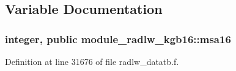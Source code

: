 \subsection{Variable Documentation}
\subsubsection[{\texorpdfstring{msa16}{msa16}}]{\setlength{\rightskip}{0pt plus 5cm}integer, public module\+\_\+radlw\+\_\+kgb16\+::msa16}\hypertarget{namespacemodule__radlw__kgb16_a95bf5395b579ca6619de3fc40c7ded79}{}\label{namespacemodule__radlw__kgb16_a95bf5395b579ca6619de3fc40c7ded79}


Definition at line 31676 of file radlw\+\_\+datatb.\+f.

